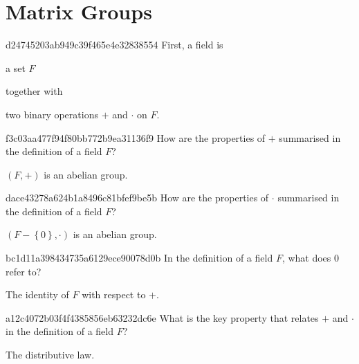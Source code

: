 \section{Matrix Groups}
\begin{note}{d24745203ab949c39f465e4e32838554}
    First, a field is \begin{icloze}{2}a set \({ F }\)\end{icloze} together with \begin{icloze}{1}two binary operations \({ + }\) and \({ \cdot }\) on \({ F }\).\end{icloze}
\end{note}

\begin{note}{f3c03aa477f94f80bb772b9ea31136f9}
    How are the properties of \({ + }\) summarised in the definition of a field \({ F }\)?

    \begin{cloze}{1}
        \({ (F, +) }\) is an abelian group.
    \end{cloze}
\end{note}

\begin{note}{dace43278a624b1a8496c81bfef9be5b}
    How are the properties of \({ \cdot }\) summarised in the definition of a field \({ F }\)?

    \begin{cloze}{1}
        \({ (F - \left\{ 0 \right\}, \cdot) }\) is an abelian group.
    \end{cloze}
\end{note}

\begin{note}{bc1d11a398434735a6129ece90078d0b}
    In the definition of a field \({ F }\), what does \({ 0 }\) refer to?

    \begin{cloze}{1}
        The identity of \({ F }\) with respect to \({ + }\).
    \end{cloze}
\end{note}

\begin{note}{a12c4072b03f4f4385856eb63232dc6e}
    What is the key property that relates \({ + }\) and \({ \cdot }\) in the definition of a field \({ F }\)?

    \begin{cloze}{1}
        The distributive law.
    \end{cloze}
\end{note}

